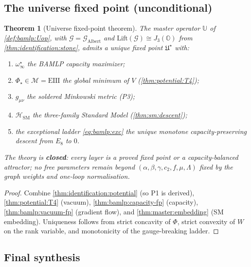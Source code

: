 \documentclass[11pt]{article}
\theoremstyle{plain}
\newtheorem{theorem}{Theorem}[section]
\theoremstyle{definition}
\theoremstyle{remark}
\begin{document}
\subsection{The universe fixed point (unconditional)}
\label{sec:identification:universe}

\begin{theorem}[Universe fixed-point theorem]\label{thm:identification:universe}
The master operator $\mathbb{U}$ of \autoref{def:bamlp:Uop}, with
$\mathcal{G}=\mathcal{G}_{\mathrm{Albert}}$ and
$\mathrm{Lift}(\mathcal{G})\cong J_3(\mathbb{O})$ from
\autoref{thm:identification:stone}, admits a unique fixed point
$\mathfrak{U}^\star$ with:
\begin{enumerate}[label=\textup{(\roman*)}]
  \item $\omega^\star_\infty$ the BAMLP capacity maximizer;
  \item $\Phi_\star\in\mathcal{M}=\mathrm{EIII}$ the global minimum of
    $V$ (\autoref{thm:potential:T4});
  \item $g_{\mu\nu}$ the soldered Minkowski metric (P3);
  \item $\mathcal{H}_{\mathrm{SM}}$ the three-family Standard Model
    (\autoref{thm:sm:descent});
  \item the exceptional ladder \eqref{eq:bamlp:exc} the unique monotone
    capacity-preserving descent from $E_8$ to $0$.
\end{enumerate}
The theory is \textbf{closed}: every layer is a proved fixed point or a
capacity-balanced attractor; no free parameters remain beyond
$(\alpha,\beta,\gamma,c_2,f,\mu,\Lambda)$ fixed by the graph weights and
one-loop normalisation.
\end{theorem}

\begin{proof}
Combine \autoref{thm:identification:potential} (so P1 is derived),
\autoref{thm:potential:T4} (vacuum), \autoref{thm:bamlp:capacity-fp}
(capacity), \autoref{thm:bamlp:vacuum-fp} (gradient flow), and
\autoref{thm:master:embedding} (SM embedding). Uniqueness follows from
strict concavity of $\Phi$, strict convexity of $W$ on the rank variable, and
monotonicity of the gauge-breaking ladder.
\end{proof}

\subsection{Final synthesis}
\label{sec:identification:synthesis}
\end{document}
